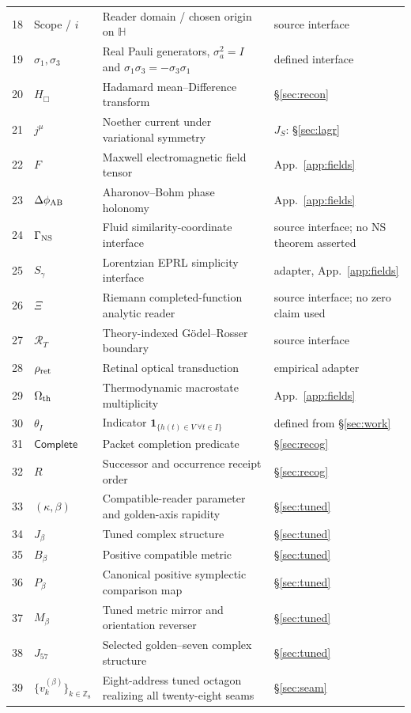 \documentclass[10pt]{article}
\newcommand{\Z}{\mathbb Z}
\begin{document}
\begin{longtable}{@{}r p{} p{} p{}@{}}
18&Scope / $i$&Reader domain / chosen origin on $\mathbb H$&source interface\\
19&$\sigma_1,\sigma_3$&Real Pauli generators, $\sigma_a^2=I$ and $\sigma_1\sigma_3=-\sigma_3\sigma_1$&defined interface\\
20&$H_\Box$&Hadamard mean--Difference transform&\S\ref{sec:recon}\\
21&$j^\mu$&Noether current under variational symmetry&$J_S$: \S\ref{sec:lagr}\\
22&$F$&Maxwell electromagnetic field tensor&App.~\ref{app:fields}\\
23&$\Delta\phi_{\rm AB}$&Aharonov--Bohm phase holonomy&App.~\ref{app:fields}\\
24&$\Gamma_{\rm NS}$&Fluid similarity-coordinate interface&source interface; no NS theorem asserted\\
25&$S_\gamma$&Lorentzian EPRL simplicity interface&adapter, App.~\ref{app:fields}\\
26&$\Xi$&Riemann completed-function analytic reader&source interface; no zero claim used\\
27&$\mathcal R_T$&Theory-indexed G\"odel--Rosser boundary&source interface\\
28&$\rho_{\rm ret}$&Retinal optical transduction&empirical adapter\\
29&$\Omega_{\rm th}$&Thermodynamic macrostate multiplicity&App.~\ref{app:fields}\\
30&$\theta_I$&Indicator $\mathbf1_{\{h(t)\in V\ \forall t\in I\}}$&defined from \S\ref{sec:work}\\
31&$\mathsf{Complete}$&Packet completion predicate&\S\ref{sec:recog}\\
32&$R$&Successor and occurrence receipt order&\S\ref{sec:recog}\\
33&$(\kappa,\beta)$&Compatible-reader parameter and golden-axis rapidity&\S\ref{sec:tuned}\\
34&$J_\beta$&Tuned complex structure&\S\ref{sec:tuned}\\
35&$B_\beta$&Positive compatible metric&\S\ref{sec:tuned}\\
36&$P_\beta$&Canonical positive symplectic comparison map&\S\ref{sec:tuned}\\
37&$M_\beta$&Tuned metric mirror and orientation reverser&\S\ref{sec:tuned}\\
38&$J_{57}$&Selected golden--seven complex structure&\S\ref{sec:tuned}\\
39&$\{v_k^{(\beta)}\}_{k\in\Z_8}$&Eight-address tuned octagon realizing all twenty-eight seams&\S\ref{sec:seam}\\ \bottomrule
\end{longtable}
\normalsize
\end{document}
